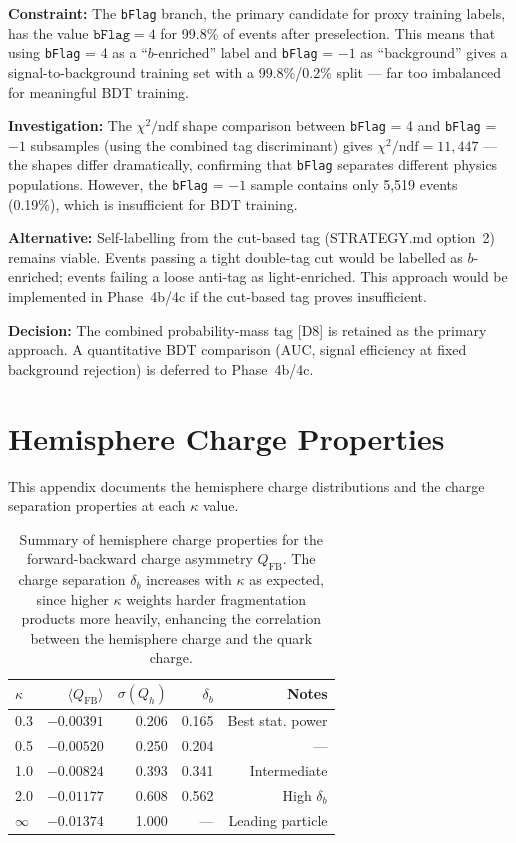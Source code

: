 \documentclass[11pt,a4paper]{article}
\begin{document}
\textbf{Constraint:} The \texttt{bFlag} branch, the primary candidate for proxy training
labels, has the value $\texttt{bFlag} = 4$ for 99.8\% of events after preselection. This
means that using \texttt{bFlag} = 4 as a ``$b$-enriched'' label and \texttt{bFlag} = $-1$
as ``background'' gives a signal-to-background training set with a 99.8\%/0.2\% split ---
far too imbalanced for meaningful BDT training.

\textbf{Investigation:} The $\chi^2/\mathrm{ndf}$ shape comparison between
\texttt{bFlag} = 4 and \texttt{bFlag} = $-1$ subsamples (using the combined tag
discriminant) gives $\chi^2/\mathrm{ndf} = 11{,}447$ --- the shapes differ dramatically,
confirming that \texttt{bFlag} separates different physics populations. However, the
\texttt{bFlag} = $-1$ sample contains only 5,519 events (0.19\%), which is insufficient
for BDT training.

\textbf{Alternative:} Self-labelling from the cut-based tag (STRATEGY.md option~2)
remains viable. Events passing a tight double-tag cut would be labelled as $b$-enriched;
events failing a loose anti-tag as light-enriched. This approach would be implemented in
Phase~4b/4c if the cut-based tag proves insufficient.

\textbf{Decision:} The combined probability-mass tag [D8] is retained as the primary
approach. A quantitative BDT comparison (AUC, signal efficiency at fixed background
rejection) is deferred to Phase~4b/4c.

\section{Hemisphere Charge Properties}
\label{app:hemisphere_charge}

This appendix documents the hemisphere charge distributions and the charge separation
properties at each $\kappa$ value.

\begin{table}[htbp]
\centering
\caption{Summary of hemisphere charge properties for the forward-backward charge
asymmetry $Q_\mathrm{FB}$. The charge separation $\delta_b$ increases with $\kappa$
as expected, since higher $\kappa$ weights harder fragmentation products more heavily,
enhancing the correlation between the hemisphere charge and the quark charge.}
\label{tab:hemisphere_charge_properties}
\begin{tabular}{lrrrr}
\toprule
$\kappa$ & $\langle Q_\mathrm{FB} \rangle$ & $\sigma(Q_h)$ & $\delta_b$ & Notes \\
\midrule
0.3 & $-0.00391$ & 0.206 & 0.165 & Best stat. power \\
0.5 & $-0.00520$ & 0.250 & 0.204 & --- \\
1.0 & $-0.00824$ & 0.393 & 0.341 & Intermediate \\
2.0 & $-0.01177$ & 0.608 & 0.562 & High $\delta_b$ \\
$\infty$ & $-0.01374$ & 1.000 & --- & Leading particle \\
\bottomrule
\end{tabular}
\end{table}
\end{document}
